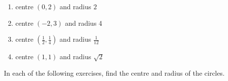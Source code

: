 \begin{enumerate}[label=\thesubsection.\arabic*, ref=\thesubsection.\theenumi, resume*]
 \item centre $(0, 2)$ and radius $2$
	 \\
		\solution
\label{chapters/11/11/1/1}

%
  \item centre $(-2, 3)$ and radius 4
	 \\
		\solution
\label{chapters/11/11/1/2}


  \item centre $\left(\frac{1}{2},  \frac{1}{4}\right)$ and radius $\frac{1}{12}$
\label{chapters/11/11/1/3}
	 \\
		\solution

  \item centre $(1, 1)$ and radius $\sqrt{2}$
	 \\
		\solution

\end{enumerate}
In each of the following exercises,   find the centre and radius of the circles.
